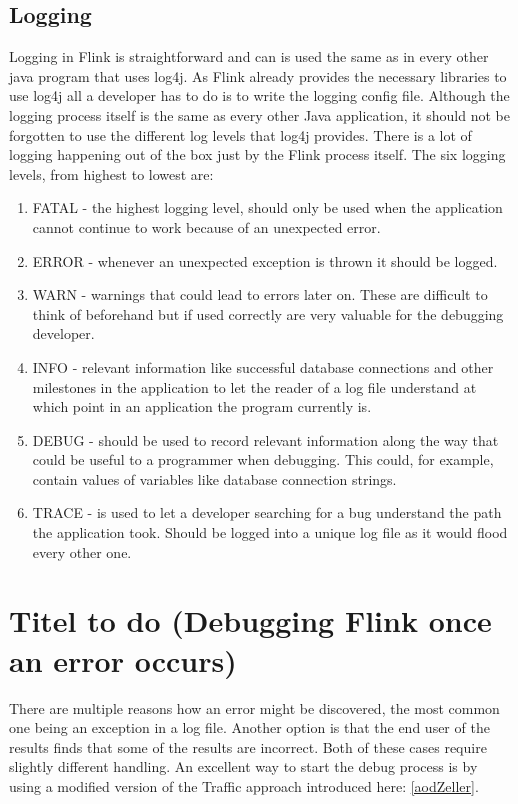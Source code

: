 \subsection{Logging}
Logging in Flink is straightforward and can is used the same as in every other java program that uses log4j. As Flink already provides the necessary libraries to use log4j all a developer has to do is to write the logging config file. Although the logging process itself is the same as every other Java application, it should not be forgotten to use the different log levels that log4j provides. There is a lot of logging happening out of the box just by the Flink process itself. The six logging levels, from highest to lowest are:
\begin{enumerate}
  \item FATAL - the highest logging level, should only be used when the application cannot continue to work because of an unexpected error.
  \item ERROR - whenever an unexpected exception is thrown it should be logged.
  \item WARN - warnings that could lead to errors later on. These are difficult to think of beforehand but if used correctly are very valuable for the debugging developer.
  \item INFO - relevant information like successful database connections and other milestones in the application to let the reader of a log file understand at which point in an application the program currently is.
  \item DEBUG - should be used to record relevant information along the way that could be useful to a programmer when debugging. This could, for example, contain values of variables like database connection strings.
  \item TRACE - is used to let a developer searching for a bug understand the path the application took. Should be logged into a unique log file as it would flood every other one.
\end{enumerate}

\section{Titel to do (Debugging Flink once an error occurs)}

There are multiple reasons how an error might be discovered, the most common one being an exception in a log file. Another option is that the end user of the results finds that some of the results are incorrect. Both of these cases require slightly different handling. An excellent way to start the debug process is by using a modified version of the Traffic approach introduced here: \ref{aodZeller}.

